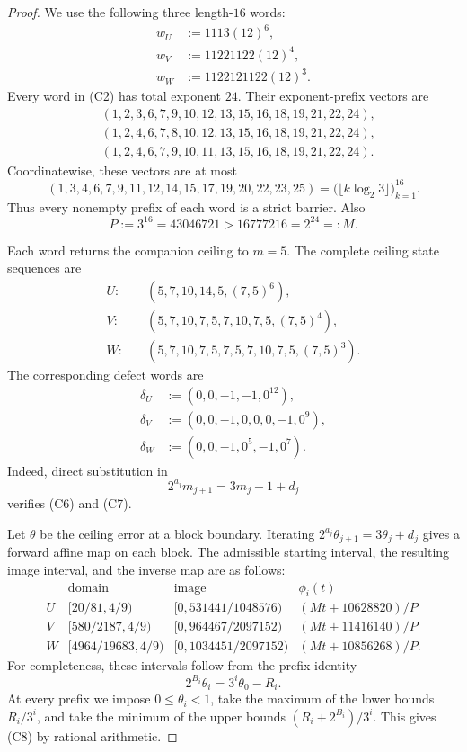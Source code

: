 \documentclass[11pt]{article}
\begin{document}
\begin{proof}
We use the following three length-$16$ words:
\[
\begin{aligned}
  w_U&:=1113(12)^6,\\
  w_V&:=11221122(12)^4,\\
  w_W&:=1122121122(12)^3.
\end{aligned}
\tag{C2}
\]
Every word in (C2) has total exponent $24$.  Their exponent-prefix vectors
are
\[
\begin{aligned}
 &(1,2,3,6,7,9,10,12,13,15,16,18,19,21,22,24),\\
 &(1,2,4,6,7,8,10,12,13,15,16,18,19,21,22,24),\\
 &(1,2,4,6,7,9,10,11,13,15,16,18,19,21,22,24).
\end{aligned}
\tag{C3}
\]
Coordinatewise, these vectors are at most
\[
  (1,3,4,6,7,9,11,12,14,15,17,19,20,22,23,25)
  =\bigl(\lfloor k\log_2 3\rfloor\bigr)_{k=1}^{16}.
  \tag{C4}
\]
Thus every nonempty prefix of each word is a strict barrier.  Also
\[
  P:=3^{16}=43046721>16777216=2^{24}=:M.
  \tag{C5}
\]

Each word returns the companion ceiling to $m=5$.  The complete ceiling
state sequences are
\[
\begin{aligned}
  U:&\quad(5,7,10,14,5,(7,5)^6),\\
  V:&\quad(5,7,10,7,5,7,10,7,5,(7,5)^4),\\
  W:&\quad(5,7,10,7,5,7,5,7,10,7,5,(7,5)^3).
\end{aligned}
\tag{C6}
\]
The corresponding defect words are
\[
\begin{aligned}
  \delta_U&:=(0,0,-1,-1,0^{12}),\\
  \delta_V&:=(0,0,-1,0,0,0,-1,0^9),\\
  \delta_W&:=(0,0,-1,0^5,-1,0^7).
\end{aligned}
\tag{C7}
\]
Indeed, direct substitution in
\[
  2^{a_j}m_{j+1}=3m_j-1+d_j
\]
verifies (C6) and (C7).

Let $\theta$ be the ceiling error at a block boundary.  Iterating
$2^{a_j}\theta_{j+1}=3\theta_j+d_j$ gives a forward affine map on each
block.  The admissible starting interval, the resulting image interval,
and the inverse map are as follows:
\[
\begin{array}{c|c|c|c}
 &\text{domain}&\text{image}&\phi_i(t)\\ \hline
 U&[20/81,4/9)&[0,531441/1048576)&(Mt+10628820)/P\\
 V&[580/2187,4/9)&[0,964467/2097152)&(Mt+11416140)/P\\
 W&[4964/19683,4/9)&[0,1034451/2097152)&(Mt+10856268)/P.
\end{array}
\tag{C8}
\]
For completeness, these intervals follow from the prefix identity
\[
  2^{B_i}\theta_i=3^i\theta_0-R_i.
  \tag{C9}
\]
At every prefix we impose $0\leq\theta_i<1$, take the maximum of the lower
bounds $R_i/3^i$, and take the minimum of the upper bounds
$(R_i+2^{B_i})/3^i$.  This gives (C8) by rational arithmetic.


\end{proof}
\end{document}
